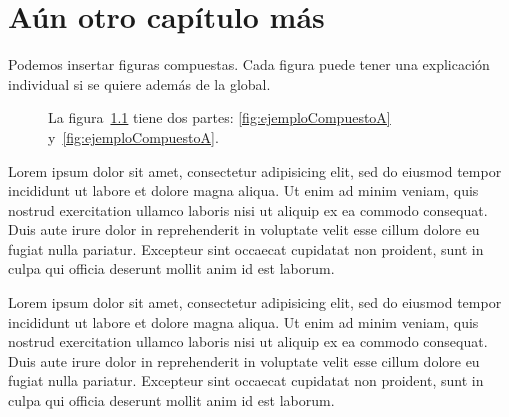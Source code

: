 \chapter{Aún otro capítulo más}

Podemos insertar figuras compuestas. Cada figura puede tener una explicación individual si se quiere además de la global.
\begin{figure}[htbp]
\centering
{}  \qquad
{} 
\caption{La figura~\ref{fig:ejemploCompuesto} tiene dos partes: \ref{fig:ejemploCompuestoA} y~\ref{fig:ejemploCompuestoA}.}
 \label{fig:ejemploCompuesto}
\end{figure}

Lorem ipsum dolor sit amet, consectetur adipisicing elit, sed do eiusmod tempor incididunt ut labore et dolore magna aliqua. Ut enim ad minim veniam, quis nostrud exercitation ullamco laboris nisi ut aliquip ex ea commodo consequat. Duis aute irure dolor in reprehenderit in voluptate velit esse cillum dolore eu fugiat nulla pariatur. Excepteur sint occaecat cupidatat non proident, sunt in culpa qui officia deserunt mollit anim id est laborum.

\par
Lorem ipsum dolor sit amet, consectetur adipisicing elit, sed do eiusmod tempor incididunt ut labore et dolore magna aliqua. Ut enim ad minim veniam, quis nostrud exercitation ullamco laboris nisi ut aliquip ex ea commodo consequat. Duis aute irure dolor in reprehenderit in voluptate velit esse cillum dolore eu fugiat nulla pariatur. Excepteur sint occaecat cupidatat non proident, sunt in culpa qui officia deserunt mollit anim id est laborum.
